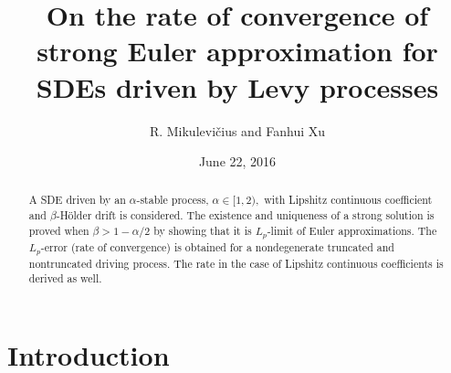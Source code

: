 \documentclass[11pt]{amsart}
\theoremstyle{plain}
\numberwithin{equation}{section}
\begin{document}
\title[Strong Euler approximation]{On the rate of convergence of strong
Euler approximation for SDEs driven by Levy processes}
\author{R. Mikulevi\v{c}ius and Fanhui Xu}
\address{University of Southern California, Los Angeles}
\date{June 22, 2016}

\begin{abstract}
A SDE driven by an $\alpha $-stable process, $\alpha \in \lbrack 1,2),$ with
Lipshitz continuous coefficient and $\beta $-H\"{o}lder drift is considered.
The existence and uniqueness of a strong solution is proved when $\beta
>1-\alpha /2$ by showing that it is $L_{p}$-limit of Euler approximations.
The $L_{p}$-error (rate of convergence) is obtained for a nondegenerate
truncated and nontruncated driving process. The rate in the case of Lipshitz
continuous coefficients is derived as well.
\end{abstract}

\maketitle
\tableofcontents

\section{Introduction}
\end{document}
